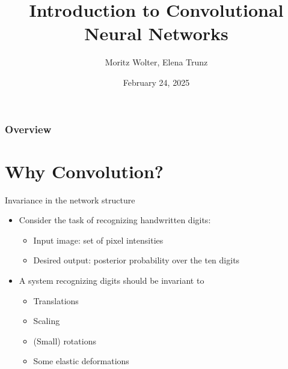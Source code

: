 \documentclass{beamer}
\title{Introduction to Convolutional Neural Networks}
\date{February 24, 2025}%
\institute{Visual Computing Group, University of Bonn}
\author{Moritz Wolter, Elena Trunz}
\begin{document}
    \maketitle

    \begin{frame}
    \frametitle{Overview} 
    \tableofcontents
    \end{frame}

		
		\section{Why Convolution?}
		\begin{frame}{Invariance in the network structure}
	\begin{figure}
        
      \end{figure}
			\begin{itemize}
		\item Consider the task of recognizing handwritten digits:
		\begin{itemize}
			\item Input image: set of pixel intensities
			\item Desired output: posterior probability over the ten digits
		\end{itemize} %
		\item A system recognizing digits should be invariant to
		\begin{itemize}
			\item Translations
			\item Scaling
			\item (Small) rotations
			\item Some elastic deformations
		\end{itemize}
		\end{itemize}
	\end{frame}
\end{document}
